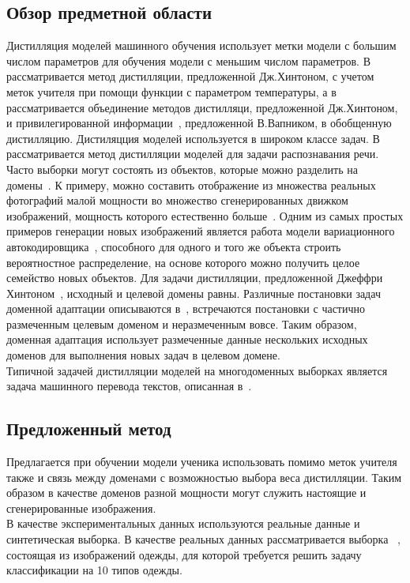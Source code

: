 \subsection{Обзор предметной области}
Дистилляция моделей машинного обучения использует метки модели с большим числом параметров для обучения модели с меньшим числом параметров. В~\cite{Hinton2015} рассматривается метод дистилляции, предложенной Дж.Хинтоном, с учетом меток учителя при помощи функции  с параметром температуры, а в~\cite{Vapnik2016} рассматривается объединение методов дистилляци, предложенной Дж.Хинтоном, и привилегированной информации~\cite{Vapnik2016}, предложенной В.Вапником, в обобщенную дистилляцию. Дистиляцция моделей используется в широком классе задач. В~\cite{MDASR} рассматривается метод дистилляции моделей для задачи распознавания речи.\\
Часто выборки могут состоять из объектов, которые можно разделить на домены~\cite{image_to_image, DA via prompt learning}. К примеру, можно составить отображение из множества реальных фотографий малой мощности во множество сгенерированных движком изображений, мощность которого естественно больше~\cite{DA,UDA}. Одним из самых простых примеров генерации новых изображений является работа модели вариационного автокодировщика~\cite{VAE}, способного для одного и того же объекта строить вероятностное распределение, на основе которого можно получить целое семейство новых объектов. Для задачи дистилляции, предложенной Джеффри Хинтоном~\cite{Hinton2015}, исходный и целевой домены равны. Различные постановки задач доменной адаптации описываются в~\cite{DeepvisDA}, встречаются постановки с частично размеченным целевым доменом и неразмеченным вовсе. Таким образом, доменная адаптация использует размеченные данные нескольких исходных доменов для выполнения новых задач в целевом домене.\\
Типичной задачей дистилляции моделей на многодоменных выборках является задача машинного перевода текстов, описанная в~\cite{KimRush2016}.\\
\subsection{Предложенный метод}
Предлагается при обучении модели ученика использовать помимо меток учителя также и связь между доменами с возможностью выбора веса дистилляции. Таким образом в качестве доменов разной мощности могут служить настоящие и сгенерированные изображения.\\
В качестве экспериментальных данных используются реальные данные и синтетическая выборка. В качестве реальных данных рассматривается выборка ~\cite{FMNIST}, состоящая из изображений одежды, для которой требуется решить задачу классификации на 10 типов одежды.\\

